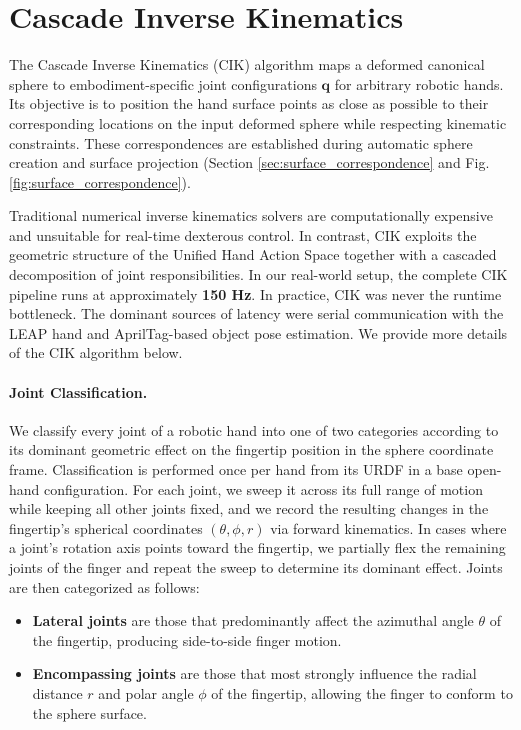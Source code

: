 \section{Cascade Inverse Kinematics}
\label{appendix:CIK}

The Cascade Inverse Kinematics (CIK) algorithm maps a deformed canonical sphere to embodiment-specific joint configurations $\mathbf{q}$ for arbitrary robotic hands. Its objective is to position the hand surface points as close as possible to their corresponding locations on the input deformed sphere while respecting kinematic constraints. These correspondences are established during automatic sphere creation and surface projection (Section \ref{sec:surface_correspondence} and Fig. \ref{fig:surface_correspondence}).

Traditional numerical inverse kinematics solvers are computationally expensive and unsuitable for real-time dexterous control. In contrast, CIK exploits the geometric structure of the Unified Hand Action Space together with a cascaded decomposition of joint responsibilities. In our real-world setup, the complete CIK pipeline runs at approximately \textbf{150 Hz}. In practice, CIK was never the runtime bottleneck. The dominant sources of latency were serial communication with the LEAP hand and AprilTag-based object pose estimation. We provide more details of the CIK algorithm below.

\paragraph{Joint Classification.}
We classify every joint of a robotic hand into one of two categories according to its dominant geometric effect on the fingertip position in the sphere coordinate frame. Classification is performed once per hand from its URDF in a base open-hand configuration. For each joint, we sweep it across its full range of motion while keeping all other joints fixed, and we record the resulting changes in the fingertip's spherical coordinates $(\theta, \phi, r)$ via forward kinematics. In cases where a joint's rotation axis points toward the fingertip, we partially flex the remaining joints of the finger and repeat the sweep to determine its dominant effect. Joints are then categorized as follows:

\begin{itemize}
    \item \textbf{Lateral joints} are those that predominantly affect the azimuthal angle $\theta$ of the fingertip, producing side-to-side finger motion.
    \item \textbf{Encompassing joints} are those that most strongly influence the radial distance $r$ and polar angle $\phi$ of the fingertip, allowing the finger to conform to the sphere surface.
\end{itemize}

